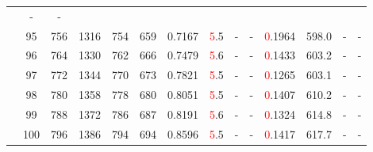 \begin{table}[htb]
{\begin{tabular}{|c|c|c|c|c|c|c|c|c|c|c|c|c|c|}
 & - & -
 \\
 & 
95 & 756 & 1316 & 754 & 659
 & 0.7167 & \textcolor{red}5.5
 & - & -
 & \textcolor{red}0.1964 & 598.0
 & - & -
 \\
 & 
96 & 764 & 1330 & 762 & 666
 & 0.7479 & \textcolor{red}5.6
 & - & -
 & \textcolor{red}0.1433 & 603.2
 & - & -
 \\
 & 
97 & 772 & 1344 & 770 & 673
 & 0.7821 & \textcolor{red}5.5
 & - & -
 & \textcolor{red}0.1265 & 603.1
 & - & -
 \\
 & 
98 & 780 & 1358 & 778 & 680
 & 0.8051 & \textcolor{red}5.5
 & - & -
 & \textcolor{red}0.1407 & 610.2
 & - & -
 \\
 & 
99 & 788 & 1372 & 786 & 687
 & 0.8191 & \textcolor{red}5.6
 & - & -
 & \textcolor{red}0.1324 & 614.8
 & - & -
 \\
 & 
100 & 796 & 1386 & 794 & 694
 & 0.8596 & \textcolor{red}5.5
 & - & -
 & \textcolor{red}0.1417 & 617.7
 & - & -
 \\
\hline
\end{tabular}}
\end{table}